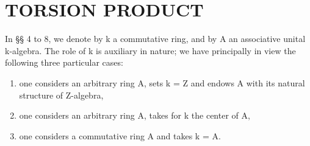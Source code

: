 \section{TORSION PRODUCT}

In §§ 4 to 8, we denote by k a commutative ring, and by A an associative unital k-algebra. The role of k is auxiliary in nature; we have principally in view the following three particular cases:

\begin{enumerate}
\def\labelenumi{\alph{enumi})}
\item
  one considers an arbitrary ring A, sets k = Z and endows A with its natural structure of Z-algebra,
\item
  one considers an arbitrary ring A, takes for k the center of A,
\item
  one considers a commutative ring A and takes k = A.
\end{enumerate}

